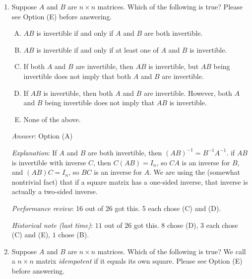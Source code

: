 \documentclass[10pt]{amsart}
\begin{document}
\begin{enumerate}
  {\em How did we construct these examples}: These examples fall out
  of the ``linear transformations and finite state automata''
  framework. In fact, there are questions on that quiz that directly
  correspond to the construction of examples for this situation. Can
  you locate them?

  {\em Performance review}: 19 out of 26 got this. 5 chose (C), 1 each
  chose (A) and (B).

  {\em Historical note (last time)}: $6$ out of $26$ got this. $9$
  chose (D), $5$ each chose (B) and (C), $1$ chose (A).
\item Suppose $A$ and $B$ are $n \times n$ matrices. Which of the
  following is true? Please see Option (E) before answering.

  \begin{enumerate}[(A)]
  \item $AB$ is invertible if and only if $A$ and $B$ are both invertible.
  \item $AB$ is invertible if and only if at least one of $A$ and $B$ is invertible.
  \item If both $A$ and $B$ are invertible, then $AB$ is invertible, but
    $AB$ being invertible does not imply that both $A$ and $B$ are
    invertible.
  \item If $AB$ is invertible, then both $A$ and $B$ are
    invertible. However, both $A$ and $B$ being invertible does not
    imply that $AB$ is invertible.
  \item None of the above.
  \end{enumerate}

  {\em Answer}: Option (A)

  {\em Explanation}: If $A$ and $B$ are both invertible, then
  $(AB)^{-1} = B^{-1}A^{-1}$. if $AB$ is invertible with inverse $C$,
  then $C(AB) = I_n$, so $CA$ is an inverse for $B$, and $(AB)C =
  I_n$, so $BC$ is an inverse for $A$. We are using the (somewhat
  nontrivial fact) that if a square matrix has a one-sided inverse,
  that inverse is actually a two-sided inverse.

  {\em Performance review}: 16 out of 26 got this. 5 each chose (C)
  and (D).

  {\em Historical note (last time)}: $11$ out of $26$ got this. $8$
  chose (D), $3$ each chose (C) and (E), $1$ chose (B).

\item Suppose $A$ and $B$ are $n \times n$ matrices. Which of the
  following is true? We call a $n \times n$ matrix {\em idempotent} if
  it equals its own square. Please see Option (E) before answering.


\end{enumerate}
\end{document}
